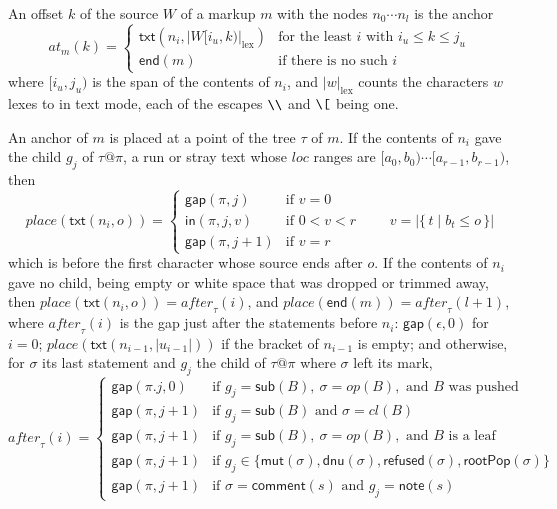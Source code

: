 \documentclass[11pt]{article}
\numberwithin{equation}{section}
\newcommand{\kw}[1]{\ensuremath{\mathsf{#1}}}
\newcommand{\str}[1]{\ensuremath{\text{\texttt{#1}}}}
\newcommand{\bs}{\textbackslash}
\begin{document}
An offset $k$ of the source $W$ of a markup $m$ with the nodes $n_0 \cdots
n_l$ is the anchor
\begin{equation}\label{eq:caret-anchor}
\mathit{at}_m(k) =
\begin{cases}
\kw{txt}(n_i, |W[i_u, k)|_{\mathrm{lex}}) & \text{for the least } i
  \text{ with } i_u \le k \le j_u \\
\kw{end}(m) & \text{if there is no such } i
\end{cases}
\end{equation}
where $[i_u, j_u)$ is the span of the contents of $n_i$, and
$|w|_{\mathrm{lex}}$ counts the characters $w$ lexes to in text mode, each
of the escapes $\str{\bs\bs}$ and $\str{\bs[}$ being one.

An anchor of $m$ is placed at a point of the tree $\tau$ of $m$.  If the
contents of $n_i$ gave the child $g_j$ of $\tau@\pi$, a run or stray text
whose $\mathit{loc}$ ranges are $[a_0, b_0) \cdots [a_{r-1}, b_{r-1})$,
then
\begin{equation}\label{eq:caret-resolve}
\mathit{place}(\kw{txt}(n_i, o)) =
\begin{cases}
\kw{gap}(\pi, j) & \text{if } v = 0 \\
\kw{in}(\pi, j, v) & \text{if } 0 < v < r \\
\kw{gap}(\pi, j{+}1) & \text{if } v = r
\end{cases}
\qquad
v = |\{\, t \mid b_t \le o \,\}|
\end{equation}
which is before the first character whose source ends after $o$.  If the
contents of $n_i$ gave no child, being empty or white space that was
dropped or trimmed away, then $\mathit{place}(\kw{txt}(n_i, o)) =
\mathit{after}_\tau(i)$, and $\mathit{place}(\kw{end}(m)) =
\mathit{after}_\tau(l{+}1)$, where $\mathit{after}_\tau(i)$ is the gap just
after the statements before $n_i$: $\kw{gap}(\epsilon, 0)$ for $i = 0$;
$\mathit{place}(\kw{txt}(n_{i-1}, |u_{i-1}|))$ if the bracket of $n_{i-1}$
is empty; and otherwise, for $\sigma$ its last statement and $g_j$ the
child of $\tau@\pi$ where $\sigma$ left its mark,
\[
\mathit{after}_\tau(i) =
\begin{cases}
\kw{gap}(\pi.j, 0) & \text{if } g_j = \kw{sub}(B),\ \sigma = \mathit{op}(B),
  \text{ and } B \text{ was pushed} \\
\kw{gap}(\pi, j{+}1) & \text{if } g_j = \kw{sub}(B) \text{ and } \sigma =
  \mathit{cl}(B) \\
\kw{gap}(\pi, j{+}1) & \text{if } g_j = \kw{sub}(B),\ \sigma =
  \mathit{op}(B), \text{ and } B \text{ is a leaf} \\
\kw{gap}(\pi, j{+}1) & \text{if } g_j \in \{\kw{mut}(\sigma),
  \kw{dnu}(\sigma), \kw{refused}(\sigma), \kw{rootPop}(\sigma)\} \\
\kw{gap}(\pi, j{+}1) & \text{if } \sigma = \kw{comment}(s) \text{ and } g_j =
  \kw{note}(s)
\end{cases}
\]
\end{document}
